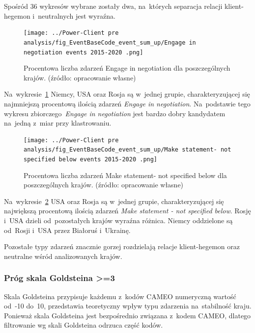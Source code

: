 \documentclass[11pt]{report}
\begin{document}
    Spośród 36 wykresów wybrane zostały dwa, na~których separacja relacji klient-hegemon i~neutralnych jest wyraźna.

    \begin{figure}[tp]
        \centering
        \texttt{[image: ../Power-Client pre analysis/fig\_EventBaseCode\_event\_sum\_up/Engage in negotiation events 2015-2020 .png]}
        \caption{Procentowa liczba zdarzeń Engage in negotiation dla poszczególnych krajów. (źródło: opracowanie własne)}
        \label{fig:Power-Client:ERC:SumUp:Engage in negotiation}
    \end{figure}

    Na~wykresie~\ref{fig:Power-Client:ERC:SumUp:Engage in negotiation} Niemcy, USA oraz Rosja są w~jednej grupie,
    charakteryzującej się najmniejszą procentową ilością zdarzeń \textit{Engage in negotiation}.
    Na~podstawie tego wykresu zbiorczego~\textit{Engage in negotiation}
    jest bardzo dobry kandydatem na~jedną z~miar przy klastrowaniu.

    \begin{figure}[tp]
        \centering
        \texttt{[image: ../Power-Client pre analysis/fig\_EventBaseCode\_event\_sum\_up/Make statement- not specified below events 2015-2020 .png]}
        \caption{Procentowa liczba zdarzeń Make statement- not specified below dla poszczególnych krajów. (źródło: opracowanie własne)}
        \label{fig:Power-Client:ERC:SumUp:Make statement - not specified below}
    \end{figure}

    Na~wykresie~\ref{fig:Power-Client:ERC:SumUp:Make statement - not specified below} USA oraz Rosja są w~jednej grupie,
    charakteryzującej się największą procentową ilością zdarzeń \textit{Make statement - not specified below}.
    Rosję i~USA dzieli od~pozostałych krajów wyraźna różnica.
    Niemcy oddzielone są od~Rosji i~USA przez Białoruś i~Ukrainę.

    Pozostałe typy zdarzeń znacznie gorzej rozdzielają relacje klient-hegemon oraz neutralne wśród analizowanych krajów.

    \subsubsection{Próg skala Goldsteina >=3}
    Skala Goldsteina przypisuje każdemu z~kodów CAMEO numeryczną wartość od~-10 do~10, przedstawia teoretyczny wpływ typu zdarzenia na~stabilność kraju.
    Ponieważ skala Goldsteina jest bezpośrednio związana z~kodem CAMEO, dlatego filtrowanie wg skali Goldsteina odrzuca część kodów.
\end{document}
